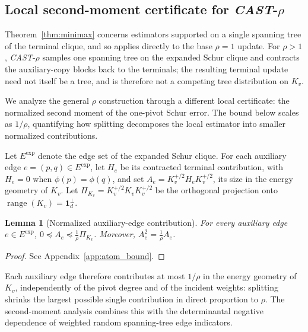 \documentclass{article}
\newcommand{\CAST}{\textit{CAST}\xspace}
\newcommand{\1}{\mathbbm{1}}
\theoremstyle{plain}
\newtheorem{lemma}[theorem]{Lemma}
\begin{document}
\subsection{Local second-moment certificate for
\texorpdfstring{\CAST-$\rho$}{CAST-rho}}
\label{ssec:second-moment}

Theorem~\ref{thm:minimax} concerns estimators supported on a single
spanning tree of the terminal clique, and so applies directly to the
base $\rho=1$ update. For $\rho>1$, \CAST-$\rho$ samples one spanning
tree on the expanded Schur clique and contracts the auxiliary-copy
blocks back to the terminals; the resulting terminal update need not
itself be a tree, and is therefore not a competing tree distribution
on $K_v$.

We analyze the general $\rho$ construction through a different local
certificate: the normalized second moment of the one-pivot Schur
error. The bound below scales as $1/\rho$, quantifying how splitting
decomposes the local estimator into smaller normalized contributions.

Let $E^{\mathrm{exp}}$ denote the edge set of the expanded Schur
clique. For each auxiliary edge $e=(p,q)\in E^{\mathrm{exp}}$, let
$H_e$ be its contracted terminal contribution, with $H_e=0$ when
$\phi(p)=\phi(q)$, and set $A_e=K_v^{+/2}H_eK_v^{+/2}$, its size in
the energy geometry of $K_v$. Let
$\Pi_{K_v}=K_v^{+/2}K_vK_v^{+/2}$ be the orthogonal projection onto
$\operatorname{range}(K_v)=\mathbf 1_d^\perp$.

\begin{lemma}[Normalized auxiliary-edge contribution]
\label{lem:atom-bound}
For every auxiliary edge $e\in E^{\mathrm{exp}}$,
$0\preceq A_e\preceq\frac{1}{\rho}\Pi_{K_v}$. Moreover,
$A_e^2=\frac{1}{\rho}A_e$.
\end{lemma}

\begin{proof}
See Appendix~\ref{app:atom_bound}.
\end{proof}

Each auxiliary edge therefore contributes at most $1/\rho$ in the
energy geometry of $K_v$, independently of the pivot degree and of the
incident weights: splitting shrinks the largest possible single
contribution in direct proportion to $\rho$. The second-moment
analysis combines this with the determinantal negative dependence of
weighted random spanning-tree edge indicators.
\end{document}
